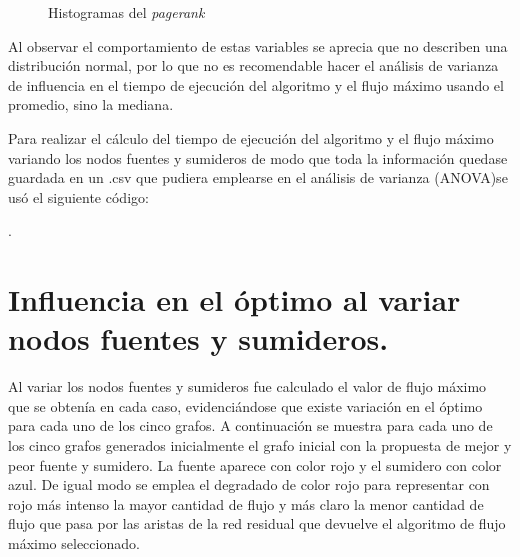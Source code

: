 \documentclass{article}
\begin{document}
\begin{figure}[htbp]
\caption{Histogramas del \textit{pagerank}}
\label{Fig7} 
\end{figure}

Al observar el comportamiento de estas variables se aprecia que no describen una distribución normal, por lo que no es recomendable hacer el análisis de varianza de influencia en el tiempo de ejecución del algoritmo y el flujo máximo usando el promedio, sino la mediana.

Para realizar el cálculo del tiempo de ejecución del algoritmo y el flujo máximo variando los nodos fuentes y sumideros de modo que toda la información quedase guardada en un .csv que pudiera emplearse en el análisis de varianza (ANOVA)se usó el siguiente código:

\newpage
.

\section{Influencia en el óptimo al variar nodos fuentes y sumideros.} 

Al variar los nodos fuentes y sumideros fue calculado el valor de flujo máximo que se obtenía en cada caso, evidenciándose que existe variación en el óptimo para cada uno de los cinco grafos. A continuación se muestra para cada uno de los cinco grafos generados inicialmente el grafo inicial con la propuesta de mejor y peor fuente y sumidero. La fuente aparece con color rojo y el sumidero con color azul. De igual modo se emplea el degradado de color rojo para representar con rojo más intenso la mayor cantidad de flujo y más claro la menor cantidad de flujo que pasa por las aristas de la red residual que devuelve el algoritmo de flujo máximo seleccionado.
\end{document}
